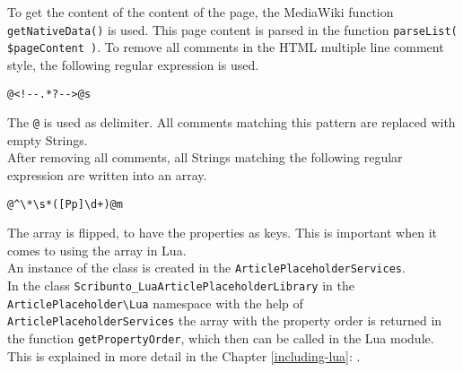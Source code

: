 To get the content of the content of the page, the MediaWiki function \texttt{getNativeData()} is used. This page content is parsed in the function \texttt{parseList( \$pageContent )}. To remove all comments in the HTML multiple line comment style, the following regular expression is used.
\begin{lstlisting}[frame=single]
@<!--.*?-->@s
\end{lstlisting}
The \texttt{@} is used as delimiter. All comments matching this pattern are replaced with empty Strings. \\
After removing all comments, all Strings matching the following regular expression are written into an array.
\begin{lstlisting}[frame=single] 
@^\*\s*([Pp]\d+)@m
\end{lstlisting}
The array is flipped, to have the properties as keys. This is important when it comes to using the array in Lua. \\
An instance of the class is created in the \texttt{ArticlePlaceholderServices}. \\
In the class \texttt{Scribunto\_LuaArticlePlaceholderLibrary} in the \texttt{ArticlePlaceholder\textbackslash{}Lua} namespace with the help of \texttt{ArticlePlaceholderServices} the array with the property order is returned in the function \texttt{getPropertyOrder}, which then can be called in the Lua module. This is explained in more detail in the Chapter \ref{including-lua}: .
